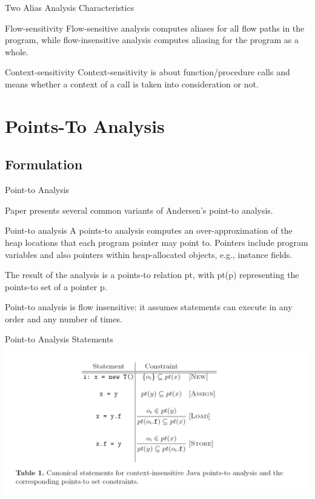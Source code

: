 \documentclass{beamer}
\begin{document}
\begin{frame}{Two Alias Analysis Characteristics}
	\begin{block}{Flow-sensitivity}
		Flow-sensitive analysis computes aliases for all flow paths in the program, while flow-insensitive
		analysis computes aliasing for the program as a whole.
	\end{block}
	\pause
	\begin{block}{Context-sensitivity}
		Context-sensitivity is about function/procedure calls and means whether a context of a call is taken
		into consideration or not.
	\end{block}
\end{frame}

\section{Points-To Analysis}

\subsection{Formulation}

\begin{frame}{Point-to Analysis}
	\begin{block}{}
		Paper presents several common variants of Andersen's point-to analysis.
	\end{block}
	\pause
	\begin{block}{Point-to analysis}
		A points-to analysis computes an over-approximation of the heap locations that
		each program pointer may point to. Pointers include program variables and also
		pointers within heap-allocated objects, e.g., instance fields. 
	\end{block}
	\pause
	\begin{block}{}
		The result of the analysis is a points-to relation pt, with pt(p) representing 
		the points-to set of a pointer p.
	\end{block}
	\pause
	\begin{block}{}
		Point-to analysis is flow insensitive: it assumes statements can execute in any order
		and any number of times.
	\end{block}	
\end{frame}

\begin{frame}{Point-to Analysis Statements}
	\includegraphics[width=\paperwidth]{table1.png}
\end{frame}
\end{document}
